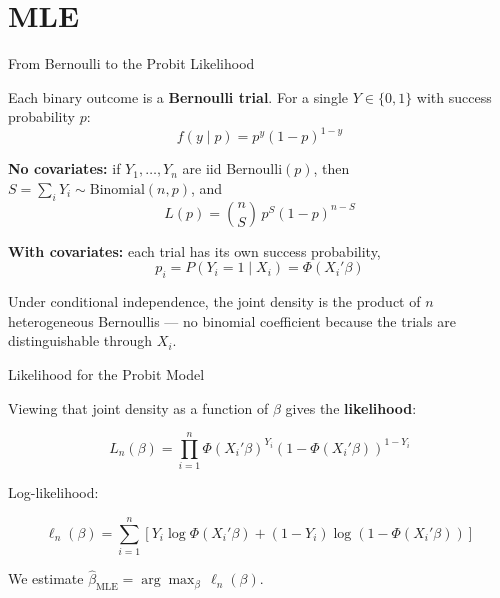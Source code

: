 \documentclass[aspectratio=169, handout, t]{beamer}
\numberwithin{equation}{section}
\begin{document}
\section{MLE}

\begin{frame}{From Bernoulli to the Probit Likelihood}

Each binary outcome is a \textbf{Bernoulli trial}. For a single $Y \in \{0,1\}$ with success probability $p$:
\[
f(y \mid p) = p^{y}(1-p)^{1-y}
\]

\pause

\textbf{No covariates:} if $Y_1,\ldots,Y_n$ are iid Bernoulli$(p)$, then $S=\sum_i Y_i \sim \text{Binomial}(n,p)$, and
\[
L(p) = \binom{n}{S}\, p^{S}(1-p)^{n-S}
\]

\pause

\textbf{With covariates:} each trial has its own success probability,
\[
p_i = P(Y_i=1 \mid X_i) = \Phi(X_i'\beta)
\]

\pause

Under conditional independence, the joint density is the product of $n$ heterogeneous Bernoullis --- no binomial coefficient because the trials are distinguishable through $X_i$.

\end{frame}


\begin{frame}{Likelihood for the Probit Model}

Viewing that joint density as a function of $\beta$ gives the \textbf{likelihood}:

\[
L_n(\beta)
=
\prod_{i=1}^n
\Phi(X_i'\beta)^{Y_i}
\left(1-\Phi(X_i'\beta)\right)^{1-Y_i}
\]

\pause

Log-likelihood:

\[
\ell_n(\beta)
=
\sum_{i=1}^n
\left[
Y_i \log \Phi(X_i'\beta)
+
(1-Y_i)\log\left(1-\Phi(X_i'\beta)\right)
\right]
\]

\pause

We estimate $\hat\beta_{\text{MLE}} = \arg\max_\beta \, \ell_n(\beta)$.

\end{frame}

\end{document}
